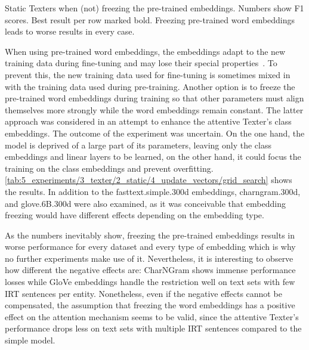 \begin{table}[t!]
    \makebox[\textwidth][c]{
        
    }
    \caption{Static Texters when (not) freezing the pre-trained embeddings. Numbers show F1 scores. Best result per row marked bold. Freezing pre-trained word embeddings leads to worse results in every case.}
    \label{tab:5_experiments/3_texter/2_static/4_update_vectors/grid_search}
\end{table}

When using pre-trained word embeddings, the embeddings adapt to the new training data during fine-tuning and may lose their special properties~\cite{He2019AnalyzingTF}. To prevent this, the new training data used for fine-tuning is sometimes mixed in with the training data used during pre-training. Another option is to freeze the pre-trained word embeddings during training so that other parameters must align themselves more strongly while the word embeddings remain constant. The latter approach was considered in an attempt to enhance the attentive Texter's class embeddings. The outcome of the experiment was uncertain. On the one hand, the model is deprived of a large part of its parameters, leaving only the class embeddings and linear layers to be learned, on the other hand, it could focus the training on the class embeddings and prevent overfitting. \autoref{tab:5_experiments/3_texter/2_static/4_update_vectors/grid_search} shows the results. In addition to the fasttext.simple.300d embeddings, charngram.300d, and glove.6B.300d were also examined, as it was conceivable that embedding freezing would have different effects depending on the embedding type.

As the numbers inevitably show, freezing the pre-trained embeddings results in worse performance for every dataset and every type of embedding which is why no further experiments make use of it. Nevertheless, it is interesting to observe how different the negative effects are: CharNGram shows immense performance losses while GloVe embeddings handle the restriction well on text sets with few IRT sentences per entity. Nonetheless, even if the negative effects cannot be compensated, the assumption that freezing the word embeddings has a positive effect on the attention mechanism seems to be valid, since the attentive Texter's performance drops less on text sets with multiple IRT sentences compared to the simple model.
